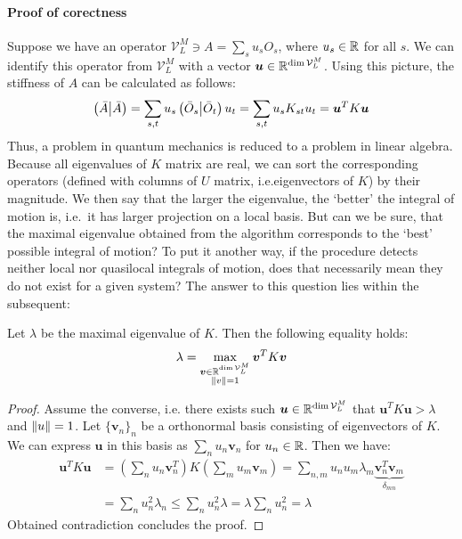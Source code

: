 \paragraph{Proof of corectness}
Suppose we have an operator \(\mathcal{V}_L^M \ni A = \sum_s u_s O_s \), where \(u_s \in \mathbb{R} \) for all \(s\).
We can identify this operator from \(\mathcal{V}_L^M\) with a vector \( \bm{u} \in \mathbb{R}^{\dim{\mathcal{V}_L^M}}\). Using this picture,
the stiffness of \(A\) can be calculated as follows:
\begin{equation}
  \left(\bar{A} \middle| \bar{A}\right) = \sum_{s,t} u_s \left(\bar{O}_s \middle| \bar{O}_t\right) u_t = \sum_{s,t} u_s K_{st} u_t = 
   \bm{u}^{T} K \bm{u}  
\end{equation} 
Thus, a problem in quantum mechanics is reduced to a problem in linear algebra.
Because all eigenvalues of \(K\) matrix are real, we can sort the corresponding operators
 (defined with columns of \(U\) matrix, i.e.\;eigenvectors of \(K\)) by their magnitude.
We then say that the larger the eigenvalue, the `better' the integral of motion is, i.e.\
it has larger projection on a local basis.
But can we be sure, that the maximal eigenvalue obtained from the algorithm corresponds
to the `best' possible integral of motion? To put it another way, if the procedure detects
neither local nor quasilocal integrals of motion, does that necessarily mean they do not exist
for a given system? The answer to this question lies within the subsequent:
\begin{proposition}
Let \(\lambda \) be the maximal eigenvalue of \(K\). Then the following equality holds:
\begin{equation*}
  \lambda = \max_{  \substack{\bm{v}\in \mathbb{R}^{\dim{\mathcal{V}_L^M}}\\\norm{v} = 1}  }{\bm{v}^{T} K \bm{v}}
\end{equation*}
\end{proposition}
\begin{proof}
  Assume the converse, i.e. there exists such \(\bm{u} \in \mathbb{R}^{\dim{\mathcal{V}_L^M}}\) that \(\bm{u}^T K \bm{u} > \lambda\)
  and \(\norm{u} = 1\).
  Let \(\{\bm{v}_n\}_n\) be a orthonormal basis consisting of eigenvectors of \(K\). We can express \(\bm{u}\) in this basis as
  \(\sum_n u_n \bm{v}_n\) for \(u_n \in \mathbb{R}\). Then we have:
  \begin{align*}    
    \bm{u}^T K \bm{u} &= \left( \sum_n u_n \bm{v}_n^{T} \right) K  \left( \sum_m u_m \bm{v}_m \right) 
    = \sum_{n,m} u_n u_m \lambda_m \underbrace{\bm{v}_n^{T} \bm{v}_m}_{\delta_{mn}} \\
    &= \sum_n u_n^2 \lambda_n \leq \sum_n u_n^2 \lambda = \lambda \sum_n u_n^2 = \lambda   
  \end{align*}
  Obtained contradiction concludes the proof.
\end{proof}

